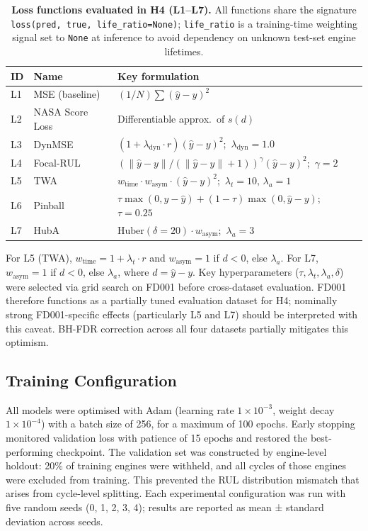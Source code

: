 \documentclass[review,12pt]{elsarticle}
\begin{document}
\begin{table}[!t]
\centering
\small
\caption*{\textbf{Loss functions evaluated in H4 (L1--L7).} All functions share the signature \texttt{loss(pred, true, life\_ratio=None)}; \texttt{life\_ratio} is a training-time weighting signal set to \texttt{None} at inference to avoid dependency on unknown test-set engine lifetimes.}
\label{tab:4}
\begin{tabular}{lll}
\toprule
\textbf{ID} & \textbf{Name} & \textbf{Key formulation} \\
\midrule
L1 & MSE (baseline) & $(1/N)\sum (\hat{y}-y)^2$ \\
L2 & NASA Score Loss & Differentiable approx.\ of $s(d)$ \\
L3 & DynMSE & $(1+\lambda_{\text{dyn}}{\cdot}r)(\hat{y}-y)^2$;\ $\lambda_{\text{dyn}}=1.0$ \\
L4 & Focal-RUL & $({\|\hat{y}-y\|}/{(\|\hat{y}-y\|+1)})^{\gamma}(\hat{y}-y)^2$;\ $\gamma=2$ \\
L5 & TWA & $w_{\text{time}}{\cdot}w_{\text{asym}}{\cdot}(\hat{y}-y)^2$;\ $\lambda_t=10,\,\lambda_a=1$ \\
L6 & Pinball & $\tau\max(0,y{-}\hat{y})+(1{-}\tau)\max(0,\hat{y}{-}y)$;\ $\tau=0.25$ \\
L7 & HubA & $\text{Huber}(\delta{=}20){\cdot}w_{\text{asym}}$;\ $\lambda_a=3$ \\
\bottomrule
\end{tabular}
\end{table}


For L5 (TWA), $w_{\text{time}} = 1 + \lambda_t \cdot r$ and $w_{\text{asym}} = 1$ if $d < 0$, else $\lambda_a$. For L7, $w_{\text{asym}} = 1$ if $d < 0$, else $\lambda_a$, where $d = \hat{y} - y$. Key hyperparameters ($\tau, \lambda_t, \lambda_a, \delta$) were selected via grid search on FD001 before cross-dataset evaluation. FD001 therefore functions as a partially tuned evaluation dataset for H4; nominally strong FD001-specific effects (particularly L5 and L7) should be interpreted with this caveat. BH-FDR correction across all four datasets partially mitigates this optimism.

\subsection{Training Configuration}

All models were optimised with Adam (learning rate $1\times10^{-3}$, weight decay $1\times10^{-4}$) with a batch size of 256, for a maximum of 100 epochs. Early stopping monitored validation loss with patience of 15 epochs and restored the best-performing checkpoint. The validation set was constructed by engine-level holdout: 20\% of training engines were withheld, and all cycles of those engines were excluded from training. This prevented the RUL distribution mismatch that arises from cycle-level splitting. Each experimental configuration was run with five random seeds (0, 1, 2, 3, 4); results are reported as mean ± standard deviation across seeds.
\end{document}
